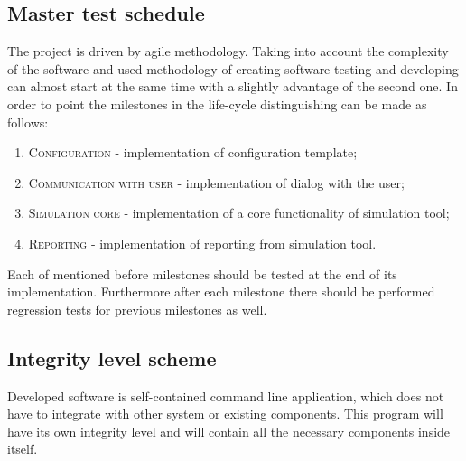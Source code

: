 \subsection{Master test schedule} \label{s:introduction:master-test-schedule}
	\begin{comment}
		$<$Describe the test activities within the project life cycle and milestones. Summarize the overall schedule of the testing tasks, identifying where task results feed back to the development, organizational, and supporting processes (e.g., quality assurance and configuration management). Describe the task iteration policy for the re-execution of test tasks and any dependencies. $>$
	\end{comment}
	The project is driven by agile methodology. Taking into account the complexity of the software and used methodology of creating software testing and developing can almost start at the same time with a slightly advantage of the second one. In order to point the milestones in the life-cycle distinguishing can be made as follows:
	\begin{enumerate}
		\item \textsc{Configuration} - implementation of configuration template;
		\item \textsc{Communication with user} - implementation of dialog with the user;
		\item \textsc{Simulation core} - implementation of a core functionality of simulation tool;
		\item \textsc{Reporting} - implementation of reporting from simulation tool.
	\end{enumerate}
	Each of mentioned before milestones should be tested at the end of its implementation. Furthermore after each milestone there should be performed regression tests for previous milestones as well. 
\subsection{Integrity level scheme} \label{s:introduction:integrity-level-scheme}
	\begin{comment}
		$<$Describe the identified integrity level scheme for the software-based system or software product, and the mapping of the selected scheme to the integrity level scheme used in this standard. If the selected integrity level scheme is the example presented in this standard, it may be referenced and does not need to be repeated in the MTP. The MTP documents the assignment of integrity levels to individual components (e.g., requirements, functions, software modules, subsystems, non-functional characteristics, or other partitions), where there are differing integrity levels assigned within the system. At the beginning of each process, the assignment of integrity levels is reassessed with respect to changes that may need to be made in the integrity levels as a result of architecture selection, design choices, code construction, or other development activities. $>$
	\end{comment}
	Developed software is self-contained command line application, which does not have to integrate with other system or existing components. This program will have its own integrity level and will contain all the necessary components inside itself.
